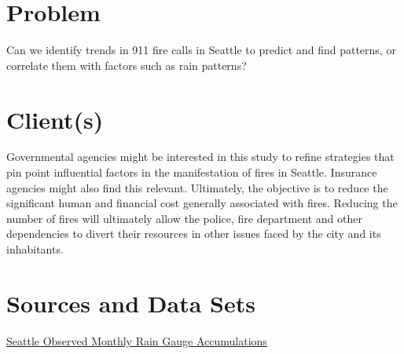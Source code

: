 \documentclass[12pt,a4paper]{article}
\begin{document}

\newpage

\tableofcontents

\newpage

\section{Problem}

Can we identify trends in 911 fire calls in Seattle to predict and find patterns, or correlate them with factors such as rain patterns?

\section{Client(s)}

Governmental agencies might be interested in this study to refine strategies that pin point influential factors in the manifestation of fires in Seattle. Insurance agencies might also find this relevant. Ultimately, the objective is to reduce the significant human and financial cost generally associated with fires. Reducing the number of fires will ultimately allow the police, fire department and other dependencies to divert their resources in other issues faced by the city and its inhabitants.

\section{Sources and Data Sets}


{\large \href{https://www.kaggle.com/city-of-seattle/seattle-observed-monthly-rain-gauge-accumulations/version/16}{Seattle Observed Monthly Rain Gauge Accumulations} \cite{Daniels2018}}
\end{document}
